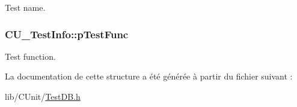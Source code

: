 Test name. 

\hypertarget{structCU__TestInfo_a8b01dd299cfa2ba6b972fea808e7b007}{
\subsubsection[{p\-Test\-Func}]{ C\-U\-\_\-\-Test\-Info\-::p\-Test\-Func}}\label{structCU__TestInfo_a8b01dd299cfa2ba6b972fea808e7b007}


Test function. 



La documentation de cette structure a été générée à partir du fichier suivant \-:\begin{DoxyCompactItemize}
\item 
lib/\-C\-Unit/\hyperlink{TestDB_8h}{Test\-D\-B.\-h}\end{DoxyCompactItemize}
